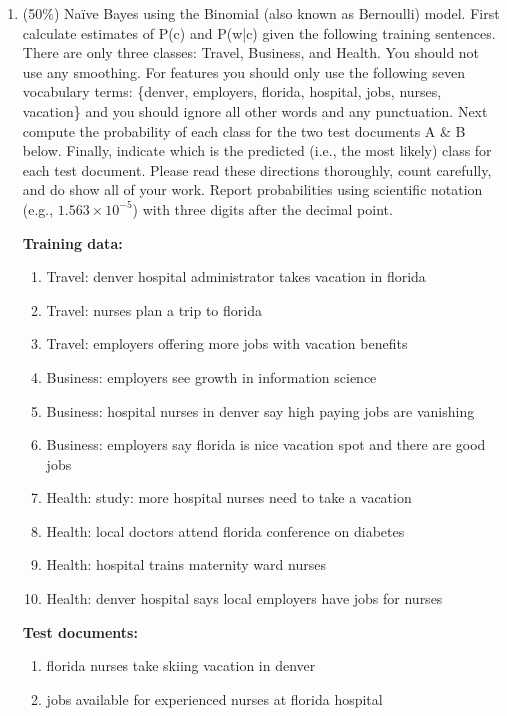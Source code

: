 \documentclass[11pt]{article}
\begin{document}
\begin{enumerate}
        \item (50\%) Naïve Bayes using the Binomial (also known as Bernoulli) model. First calculate estimates of P(c) and P(w|c) given the following training sentences. There are only three classes: Travel, Business, and Health. You should not use any smoothing. For features you should only use the following seven vocabulary terms: \{denver, employers, florida, hospital, jobs, nurses, vacation\} and you should ignore all other words and any punctuation. Next compute the probability of each class for the two test documents A \& B below. Finally, indicate which is the predicted (i.e., the most likely) class for each test document. Please read these directions thoroughly, count carefully, and do show all of your work. Report probabilities using scientific notation (e.g., $1.563 \times 10^{-5}$) with three digits after the decimal point.

        \textbf{Training data:}
        \begin{enumerate}[1)]
            \item Travel: denver hospital administrator takes vacation in florida
            \item Travel: nurses plan a trip to florida
            \item Travel: employers offering more jobs with vacation benefits
            \item Business: employers see growth in information science
            \item Business: hospital nurses in denver say high paying jobs are vanishing
            \item Business: employers say florida is nice vacation spot and there are good jobs
            \item Health: study: more hospital nurses need to take a vacation
            \item Health: local doctors attend florida conference on diabetes
            \item Health: hospital trains maternity ward nurses
            \item Health: denver hospital says local employers have jobs for nurses
        \end{enumerate}

        \textbf{Test documents:}
        \begin{enumerate}[1)]
            \item florida nurses take skiing vacation in denver
            \item jobs available for experienced nurses at florida hospital
        \end{enumerate}


\end{enumerate}
\end{document}
